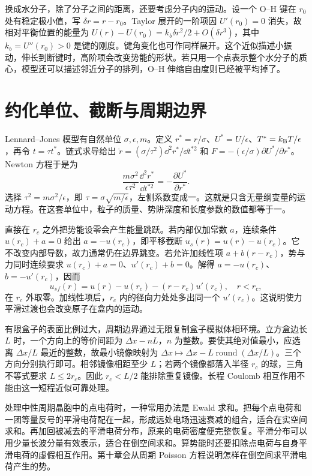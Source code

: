 换成水分子，除了分子之间的距离，还要考虑分子内的运动。设一个 O--H 键在 $r_0$ 处有稳定极小值，写 $\delta r=r-r_0$。Taylor 展开的一阶项因 $U'(r_0)=0$ 消失，故相对平衡位置的能量为 $U(r)-U(r_0)=k_b\delta r^2/2+O(\delta r^3)$，其中 $k_b=U''(r_0)>0$ 是键的刚度。键角变化也可作同样展开。这个近似描述小振动，伸长到断键时，高阶项会改变势能的形状。若只用一个点表示整个水分子的质心，模型还可以描述邻近分子的排列，O--H 伸缩自由度则已经被平均掉了。

\section{约化单位、截断与周期边界}
Lennard--Jones 模型有自然单位 $\sigma,\epsilon,m$。定义 $r^*=r/\sigma$、$U^*=U/\epsilon$、$T^*=k_{\mathrm B} T/\epsilon$，再令 $t=\tau t^*$。链式求导给出 $\ddot r=(\sigma/\tau^2)\dd^2r^*/\dd t^{*2}$ 和 $F=-(\epsilon/\sigma)\partial U^*/\partial r^*$。Newton 方程于是为
\begin{equation}
\frac{m\sigma^2}{\epsilon\tau^2}\frac{\dd^2r^*}{\dd t^{*2}}
=-\frac{\partial U^*}{\partial r^*}.
\end{equation}
选择 $\tau^2=m\sigma^2/\epsilon$，即 $\tau=\sigma\sqrt{m/\epsilon}$，左侧系数变成一。这就是只含无量纲变量的运动方程。在这套单位中，粒子的质量、势阱深度和长度参数的数值都等于一。

直接在 $r_c$ 之外把势能设零会产生能量跳跃。若内部仅加常数 $a$，连续条件 $u(r_c)+a=0$ 给出 $a=-u(r_c)$，即平移截断 $u_s(r)=u(r)-u(r_c)$。它不改变内部导数，故力通常仍在边界跳变。若允许加线性项 $a+b(r-r_c)$，势与力同时连续要求 $u(r_c)+a=0$、$u'(r_c)+b=0$。解得 $a=-u(r_c)$、$b=-u'(r_c)$，因而
\begin{equation}
u_{sf}(r)=u(r)-u(r_c)-(r-r_c)u'(r_c),\quad r<r_c,
\end{equation}
在 $r_c$ 外取零。加线性项后，$r_c$ 内的径向力处处多出同一个 $u'(r_c)$。这说明使力平滑过渡也会改变原子在盒内的运动。

有限盒子的表面比例过大，周期边界通过无限复制盒子模拟体相环境。立方盒边长 $L$ 时，一个方向上的等价间距为 $\Delta x-nL$，$n$ 为整数。要使其绝对值最小，应选离 $\Delta x/L$ 最近的整数，故最小镜像映射为 $\Delta x\mapsto\Delta x-L\operatorname{round}(\Delta x/L)$。三个方向分别执行即可。相邻镜像相距至少 $L$；若两个镜像都落入半径 $r_c$ 的球，三角不等式要求 $L\le2r_c$。因此 $r_c<L/2$ 能排除重复镜像。长程 Coulomb 相互作用不能由这一短程近似可靠处理。

处理中性周期晶胞中的点电荷时，一种常用办法是 Ewald 求和。把每个点电荷和一团等量反号的平滑电荷配在一起，形成远处电场迅速衰减的组合，适合在实空间求和。再加回被减去的平滑电荷分布，原来的电荷密度便完整恢复。平滑分布可以用少量长波分量有效表示，适合在倒空间求和。算势能时还要扣除点电荷与自身平滑电荷的虚假相互作用。第十章会从周期 Poisson 方程说明怎样在倒空间求平滑电荷产生的势。

